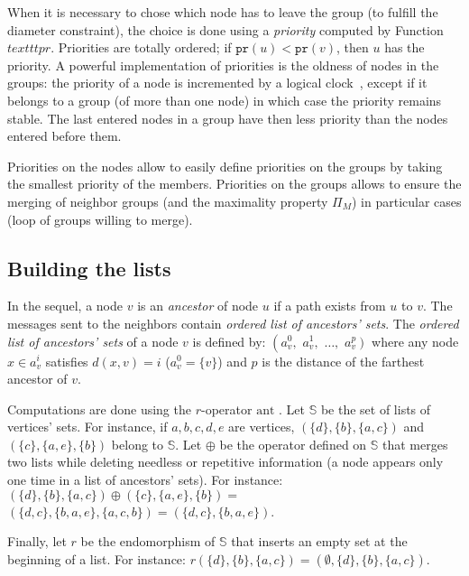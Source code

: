 \documentclass[11pt,english]{article}
\begin{document}
When it is necessary to chose which node has to leave the group (to fulfill the
diameter constraint), the choice is done using a \emph{priority} computed by Function~$texttt{pr}$. 
Priorities are
totally ordered; if $\texttt{pr}(u) < \texttt{pr}(v)$, then $u$ has the
priority. 
A powerful implementation of priorities is the oldness of nodes in the groups:
the priority of a node is incremented  by a logical clock~\cite{L78}, except if it belongs to a
group (of more than one node) in which case the priority remains stable. The
last entered nodes in a group have then less priority than the nodes entered
before them.

Priorities on the nodes allow to easily define priorities on the groups by
taking the smallest priority of the members.  Priorities on the groups allows to
ensure the merging of neighbor groups (and the maximality property $\Pi_M$) in
particular cases (loop of groups willing to merge).



\subsection{Building the lists}\label{s:ant}
In the sequel, a node $v$ is an {\em ancestor} of node $u$ if a path exists from $u$ to $v$. 
The messages sent to the neighbors contain \emph{ordered list of ancestors'
  sets}.  The \emph{ordered list of ancestors' sets} of a node $v$ is defined
by:
$\left(a_v^0, \right.$ $a_v^1,$ $\ldots,$ $\left. a_v^{p}\right)$ where any node
$x \in a_v^i$ satisfies $d(x,v) = i$ ($a_v^0 = \{ v\}$) and $p$ is the distance
of the farthest ancestor of $v$.

Computations are done using the $r$-operator $\mathrm{ant}$
\cite{JACIC06,DT03,SSS07}.
Let $\mathbb{S}$ be the set of lists of vertices' sets. For instance, if
$a,b,c,d,e$ are vertices, $\left( \{d\},\{b\},\{a, c\}\right)$ and $\left(
\{c\},\{a,e\},\{ b\}\right)$ belong to $\mathbb{S}$.
Let $\oplus$ be the operator defined on $\mathbb{S}$ that merges two lists while
deleting needless or repetitive information (a node appears only one time in a
list of ancestors' sets).  For instance: \newline
\noindent
$ \left( \{d\},\{b\},\{a, c\}\right) \oplus \left( \{c\},\{a,e\},\{ b\}\right) = $
\newline \noindent
$\left( \{d ,c\}, \{b,a,e\}, \{a,c,b\} \right) = \left(\{d,c\}, \{b,a,e\}\right)$.

Finally, let $r$ be the endomorphism of $\mathbb{S}$ that inserts an empty set at
the beginning of a list. For instance: \newline \noindent
$r( \{d\},\{b\},\{a,c\} )=(\emptyset, \{d\}, \{b\}, \{a,c\})$.
\end{document}
